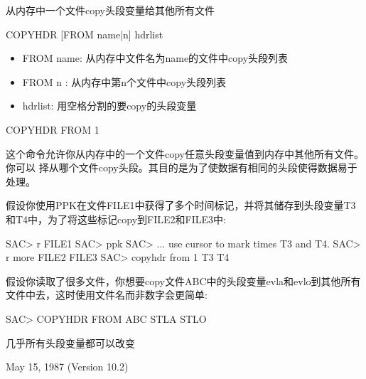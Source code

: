 \label{cmd:copyhdr}

从内存中一个文件copy头段变量给其他所有文件

COPYHDR [FROM name|n] hdrlist

\begin{itemize}
\item FROM name: 从内存中文件名为name的文件中copy头段列表 
\item FROM n : 从内存中第n个文件中copy头段列表 
\item hdrlist: 用空格分割的要copy的头段变量 
\end{itemize}

COPYHDR FROM 1

这个命令允许你从内存中的一个文件copy任意头段变量值到内存中其他所有文件。你可以
择从哪个文件copy头段。其目的是为了使数据有相同的头段使得数据易于处理。

假设你使用PPK在文件FILE1中获得了多个时间标记，并将其储存到头段变量T3和T4中，为了将这些标记copy到FILE2和FILE3中:
\begin{SACCode}
SAC> r FILE1
SAC> ppk
SAC> ... use cursor to mark times T3 and T4.
SAC> r more FILE2 FILE3
SAC> copyhdr from 1 T3 T4
\end{SACCode}
假设你读取了很多文件，你想要copy文件ABC中的头段变量evla和evlo到其他所有文件中去，这时使用文件名而非数字会更简单:
\begin{SACCode}
SAC> COPYHDR FROM ABC STLA STLO
\end{SACCode}

几乎所有头段变量都可以改变

May 15, 1987 (Version 10.2)
